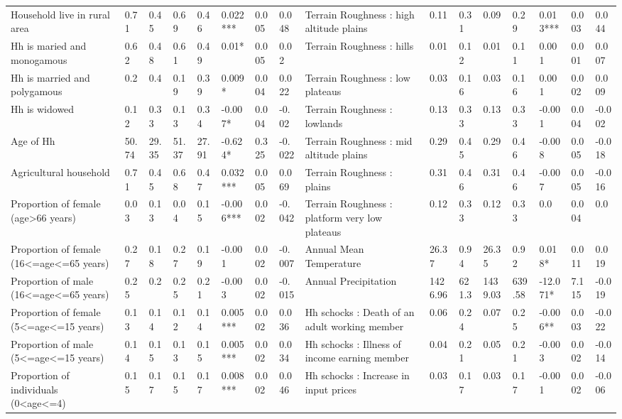 \begin{table}[H]
{\begin{tabular}{@{}llllllll|llllllll@{}}
Household live in rural area & 0.71 & 0.45 & 0.69 & 0.46 & 0.022*** & 0.005 & 0.048 & Terrain Roughness : high altitude plains & 0.11 & 0.31 & 0.09 & 0.29 & 0.013*** & 0.003 & 0.044 \\
Hh is maried and monogamous & 0.62 & 0.48 & 0.61 & 0.49 & 0.01* & 0.005 & 0.02 & Terrain Roughness : hills & 0.01 & 0.12 & 0.01 & 0.11 & 0.001 & 0.001 & 0.007 \\
Hh is married and polygamous & 0.2 & 0.4 & 0.19 & 0.39 & 0.009* & 0.004 & 0.022 & Terrain Roughness : low plateaus & 0.03 & 0.16 & 0.03 & 0.16 & 0.001 & 0.002 & 0.009 \\
Hh is widowed & 0.12 & 0.33 & 0.13 & 0.34 & -0.007* & 0.004 & -0.02 & Terrain Roughness : lowlands & 0.13 & 0.33 & 0.13 & 0.33 & -0.001 & 0.004 & -0.002 \\
Age of Hh & 50.74 & 29.35 & 51.37 & 27.91 & -0.624* & 0.325 & -0.022 & Terrain Roughness : mid altitude plains & 0.29 & 0.45 & 0.29 & 0.46 & -0.008 & 0.005 & -0.018 \\
Agricultural household & 0.71 & 0.45 & 0.68 & 0.47 & 0.032*** & 0.005 & 0.069 & Terrain Roughness : plains & 0.31 & 0.46 & 0.31 & 0.46 & -0.007 & 0.005 & -0.016 \\
Proportion of female (age\textgreater{}66 years) & 0.03 & 0.13 & 0.04 & 0.15 & -0.006*** & 0.002 & -0.042 & Terrain Roughness : platform very low plateaus & 0.12 & 0.33 & 0.12 & 0.33 & 0.0 & 0.004 & 0.0 \\
Proportion of female (16\textless{}=age\textless{}=65 years) & 0.27 & 0.18 & 0.27 & 0.19 & -0.001 & 0.002 & -0.007 & Annual Mean Temperature & 26.37 & 0.94 & 26.35 & 0.92 & 0.018* & 0.011 & 0.019 \\
Proportion of male (16\textless{}=age\textless{}=65 years) & 0.25 & 0.2 & 0.25 & 0.21 & -0.003 & 0.002 & -0.015 & Annual Precipitation & 1426.96 & 621.3 & 1439.03 & 639.58 & -12.071* & 7.115 & -0.019 \\
Proportion of female (5\textless{}=age\textless{}=15 years) & 0.13 & 0.14 & 0.12 & 0.14 & 0.005*** & 0.002 & 0.036 & Hh schocks : Death of an adult working member & 0.06 & 0.24 & 0.07 & 0.25 & -0.006** & 0.003 & -0.022 \\
Proportion of male (5\textless{}=age\textless{}=15 years) & 0.14 & 0.15 & 0.13 & 0.15 & 0.005*** & 0.002 & 0.034 & Hh schocks : Illness of income earning member & 0.04 & 0.21 & 0.05 & 0.21 & -0.003 & 0.002 & -0.014 \\
Proportion of individuals (0\textless{}age\textless{}=4) & 0.15 & 0.17 & 0.15 & 0.17 & 0.008*** & 0.002 & 0.046 & Hh schocks : Increase in input prices & 0.03 & 0.17 & 0.03 & 0.17 & -0.001 & 0.002 & -0.006 \\

\end{tabular}}
\end{table}
